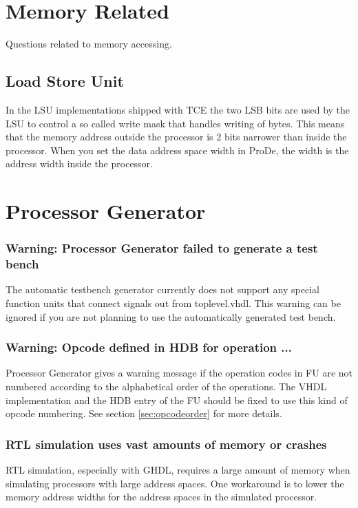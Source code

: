 \documentclass[twoside]{tceusermanual}
\begin{document}
\section{Memory Related}

Questions related to memory accessing.

\subsection{Load Store Unit}

In the LSU implementations shipped with TCE the two LSB bits are used by the LSU to control
a so called write mask that handles writing of bytes. This means that the
memory address outside the processor is 2 bits narrower than inside the
processor. When you set the data address space width in ProDe, the width
is the address width inside the processor.


\section{Processor Generator}

\subsubsection{Warning: Processor Generator failed to generate a test bench}
The automatic testbench generator currently does not support any special
function units that connect signals out from toplevel.vhdl. This warning
can be ignored if you are not planning to use the automatically generated
test bench.

\subsubsection{Warning: Opcode defined in HDB for operation ...}

Processor Generator gives a warning message if the operation codes in FU
are not numbered according to the alphabetical order of the operations.
The VHDL implementation and the HDB entry of the FU should be fixed to use 
this kind of opcode numbering. See section \ref{sec:opcodeorder} for more 
details.

\subsubsection{RTL simulation uses vast amounts of memory or crashes}

RTL simulation, especially with GHDL, requires a large amount of memory when
simulating processors with large address spaces. One workaround is to lower
the memory address widths for the address spaces in the simulated processor.
\end{document}
